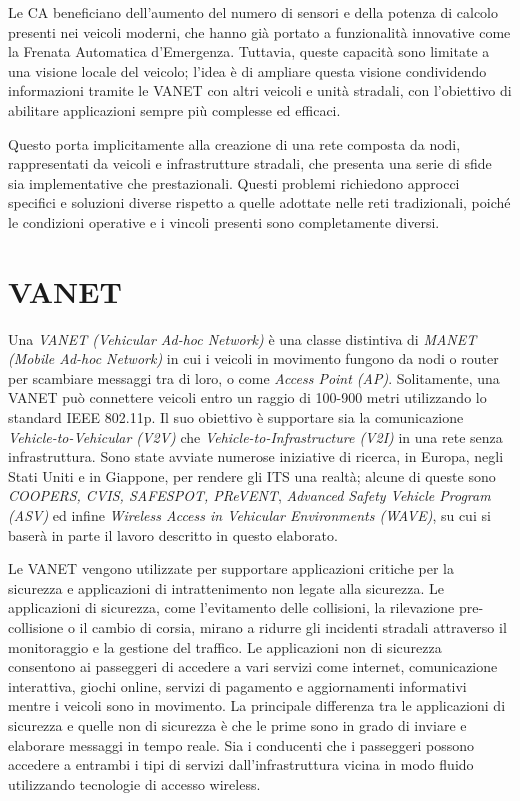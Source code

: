 Le CA beneficiano dell'aumento del numero di sensori e della potenza di calcolo presenti nei veicoli moderni, che hanno già portato a funzionalità innovative come la Frenata Automatica d'Emergenza. Tuttavia, queste capacità sono limitate a una visione locale del veicolo; l'idea è di ampliare questa visione condividendo informazioni tramite le VANET con altri veicoli e unità stradali, con l'obiettivo di abilitare applicazioni sempre più complesse ed efficaci. 

Questo porta implicitamente alla creazione di una rete composta da nodi, rappresentati da veicoli e infrastrutture stradali, che presenta una serie di sfide sia implementative che prestazionali. Questi problemi richiedono approcci specifici e soluzioni diverse rispetto a quelle adottate nelle reti tradizionali, poiché le condizioni operative e i vincoli presenti sono completamente diversi.

\section{VANET}
Una \textit{VANET (Vehicular Ad-hoc Network)} è una classe distintiva di \textit{MANET (Mobile Ad-hoc Network)} in cui i veicoli in movimento fungono da nodi o router per scambiare messaggi tra di loro, o come \textit{Access Point (AP)}. Solitamente, una VANET può connettere veicoli entro un raggio di 100-900 metri utilizzando lo standard IEEE 802.11p. Il suo obiettivo è supportare sia la comunicazione \textit{Vehicle-to-Vehicular (V2V)} che \textit{Vehicle-to-Infrastructure (V2I)} in una rete senza infrastruttura. Sono state avviate numerose iniziative di ricerca, in Europa, negli Stati Uniti e in Giappone, per rendere gli ITS una realtà; alcune di queste sono \textit{COOPERS, CVIS, SAFESPOT, PReVENT}, \textit{Advanced Safety Vehicle Program (ASV)} ed infine \textit{Wireless Access in Vehicular Environments (WAVE)}, su cui si baserà in parte il lavoro descritto in questo elaborato.

Le VANET vengono utilizzate per supportare applicazioni critiche per la sicurezza e applicazioni di intrattenimento non legate alla sicurezza. Le applicazioni di sicurezza, come l'evitamento delle collisioni, la rilevazione pre-collisione o il cambio di corsia, mirano a ridurre gli incidenti stradali attraverso il monitoraggio e la gestione del traffico. Le applicazioni non di sicurezza consentono ai passeggeri di accedere a vari servizi come internet, comunicazione interattiva, giochi online, servizi di pagamento e aggiornamenti informativi mentre i veicoli sono in movimento. La principale differenza tra le applicazioni di sicurezza e quelle non di sicurezza è che le prime sono in grado di inviare e elaborare messaggi in tempo reale. Sia i conducenti che i passeggeri possono accedere a entrambi i tipi di servizi dall'infrastruttura vicina in modo fluido utilizzando tecnologie di accesso wireless.

